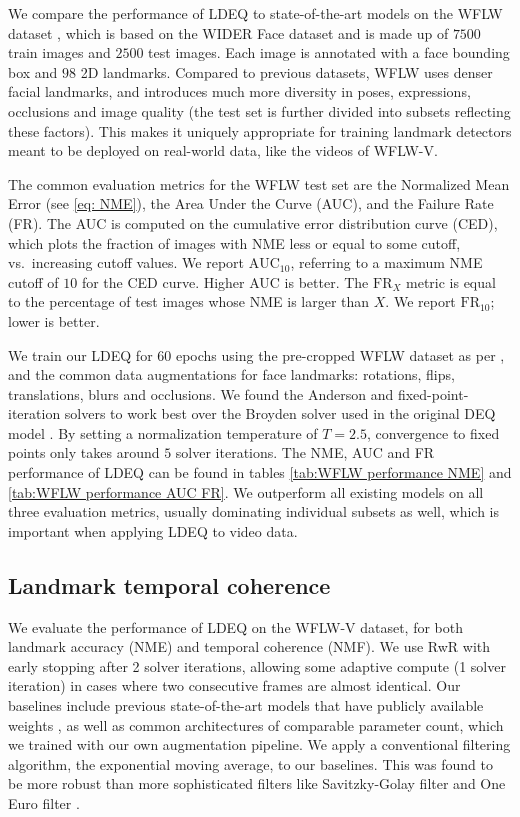 \documentclass[10pt,twocolumn,letterpaper]{article}
\begin{document}
We compare the performance of LDEQ to state-of-the-art models on the WFLW dataset \cite{Wayne2018LookAtBoundary}, which is based on the WIDER Face dataset \cite{Yang2016WiderFace} and is made up of $7500$ train images and $2500$ test images. Each image is annotated with a face bounding box and $98$ 2D landmarks. Compared to previous datasets, WFLW uses denser facial landmarks, and introduces much more diversity in poses, expressions, occlusions and image quality (the test set is further divided into subsets reflecting these factors). This makes it uniquely appropriate for training landmark detectors meant to be deployed on real-world data, like the videos of WFLW-V.

The common evaluation metrics for the WFLW test set are the Normalized Mean Error (see \cref{eq: NME}), the Area Under the Curve (AUC), and the Failure Rate (FR). The AUC is computed on the cumulative error distribution curve (CED), which plots the fraction of images with NME less or equal to some cutoff, vs.\ increasing cutoff values. We report $\text{AUC}_{10}$, referring to a maximum NME cutoff of $10$ for the CED curve. Higher AUC is better. The $\text{FR}_X$ metric is equal to the percentage of test images whose NME is larger than $X$. We report $\text{FR}_{10}$; lower is better.

We train our LDEQ for $60$ epochs using the pre-cropped WFLW dataset as per \cite{Lan2021HIH}, and the common data augmentations for face landmarks: rotations, flips, translations, blurs and occlusions. We found the Anderson and fixed-point-iteration solvers to work best over the Broyden solver used in the original DEQ model \cite{Bai2019DEQs, Bai2020MDEQs}. By setting a normalization temperature of $T=2.5$, convergence to fixed points only takes around $5$ solver iterations. The NME, AUC and FR performance of LDEQ can be found in tables \ref{tab:WFLW performance NME} and \ref{tab:WFLW performance AUC FR}. We outperform all existing models on all three evaluation metrics, usually dominating individual subsets as well, which is important when applying LDEQ to video data.

\subsection{Landmark temporal coherence}
\label{subsec: exp-landmark coherence}
We evaluate the performance of LDEQ on the WFLW-V dataset, for both landmark accuracy (NME) and temporal coherence (NMF). We use RwR with early stopping after 2 solver iterations, allowing some adaptive compute (1 solver iteration) in cases where two consecutive frames are almost identical. Our baselines include previous state-of-the-art models that have publicly available weights \cite{Lan2021HIH, Xia2022SLPT, Lin2021StructureCoherent, Wang2019AdaptiveWingLoss}, as well as common architectures of comparable parameter count, which we trained with our own augmentation pipeline. We apply a conventional filtering algorithm, the exponential moving average, to our baselines. This was found to be more robust than more sophisticated filters like Savitzky-Golay filter \cite{SavitzkyGolay1964Filter} and One Euro filter \cite{Casiez2012OneEuroFilter}.
\end{document}
